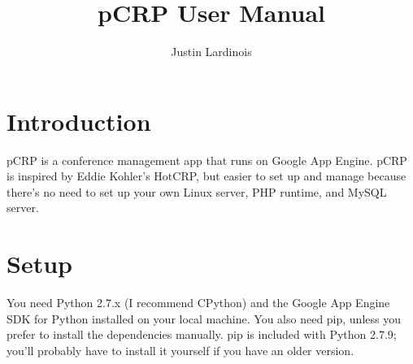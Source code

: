 \documentclass[12pt]{article}
\title{pCRP User Manual}
\author{Justin Lardinois}
\date{}
\begin{document}
\maketitle

\section{Introduction}
	pCRP is a conference management app that runs on Google App Engine.
	pCRP is inspired by Eddie Kohler's HotCRP, \cite{kohler} but easier
	to set up and manage because there's no need to set up your own Linux
	server, PHP runtime, and MySQL server.
\section{Setup}
	You need Python 2.7.x (I recommend CPython) and the Google App Engine
	SDK for Python \cite{gaesdk} installed on your local machine. You also
	need pip, unless you prefer to install the dependencies manually. pip
	is included with Python 2.7.9; you'll probably have to install it
	yourself if you have an older version.



\end{document}

